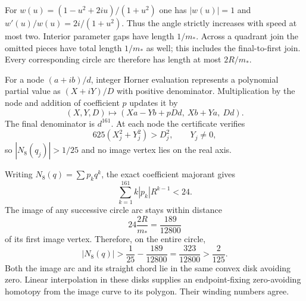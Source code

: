 \documentclass[11pt]{article}
\theoremstyle{definition}\newtheorem{definition}[theorem]{Definition}
\theoremstyle{remark}\newtheorem{remark}[theorem]{Remark}
\begin{document}
For $w(u)=(1-u^2+2iu)/(1+u^2)$ one has $|w(u)|=1$ and
$w'(u)/w(u)=2i/(1+u^2)$. Thus the angle strictly increases with speed at most two. Interior parameter gaps have length $1/m_*$. Across a quadrant join the omitted pieces have total length $1/m_*$ as well; this includes the final-to-first join. Every corresponding circle arc therefore has length at most $2R/m_*$.

For a node $(a+ib)/d$, integer Horner evaluation represents a polynomial partial value as $(X+iY)/D$ with positive denominator. Multiplication by the node and addition of coefficient $p$ updates it by
\[
 (X,Y,D)\longmapsto(Xa-Yb+pDd,\ Xb+Ya,\ Dd).
\]
The final denominator is $d^{161}$. At each node the certificate verifies
\begin{equation}\label{tdc:eq:nodemod}
 625(X_j^2+Y_j^2)>D_j^2,\qquad Y_j\ne0,
\end{equation}
so $|N_8(q_j)|>1/25$ and no image vertex lies on the real axis.

Writing $N_8(q)=\sum p_kq^k$, the exact coefficient majorant gives
\[
 \sum_{k=1}^{161}k|p_k|R^{k-1}<24.
\]
The image of any successive circle arc stays within distance
\[
 24\frac{2R}{m_*}=\frac{189}{12800}
\]
of its first image vertex. Therefore, on the entire circle,
\begin{equation}\label{tdc:eq:wholecircle}
 |N_8(q)|>\frac1{25}-\frac{189}{12800}
 =\frac{323}{12800}>\frac2{125}.
\end{equation}
Both the image arc and its straight chord lie in the same convex disk avoiding zero. Linear interpolation in these disks supplies an endpoint-fixing zero-avoiding homotopy from the image curve to its polygon. Their winding numbers agree.
\end{document}
